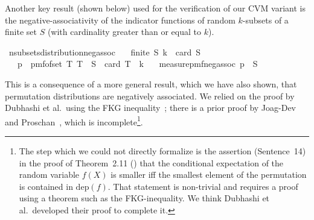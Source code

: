 Another key result (shown below) used for the verification of our CVM variant is the negative-associativity of the indicator functions of random $k$-subsets of a finite set $S$ (with cardinality greater than or equal to $k$).
\begin{isabelle_cm}
\isamarkupfalse%
\ n{\isacharunderscore}{\kern0pt}subsets{\isacharunderscore}{\kern0pt}distribution{\isacharunderscore}{\kern0pt}neg{\isacharunderscore}{\kern0pt}assoc{\isacharcolon}{\kern0pt}\isanewline
\ \ \ {\isacartoucheopen}finite\ S{\isacartoucheclose}\ {\isacartoucheopen}k\ {\isasymle}\ card\ S{\isacartoucheclose}\isanewline
\ \ \ {\isacartoucheopen}p\ {\isasymequiv}\ pmf{\isacharunderscore}{\kern0pt}of{\isacharunderscore}{\kern0pt}set\ {\isacharbraceleft}{\kern0pt}T{\isachardot}{\kern0pt}\ T\ {\isasymsubseteq}\ S\ {\isasymand}\ card\ T\ {\isacharequal}{\kern0pt}\ k{\isacharbraceright}{\kern0pt}{\isacartoucheclose}\isanewline
\ \ \ {\isacartoucheopen}measure{\isacharunderscore}{\kern0pt}pmf{\isachardot}{\kern0pt}neg{\isacharunderscore}{\kern0pt}assoc\ p\ {\isacharparenleft}{\kern0pt}{\isasymin}{\isacharparenright}{\kern0pt}\ S{\isacartoucheclose}
\end{isabelle_cm}
This is a consequence of a more general result, which we have also shown, that permutation distributions are negatively associated.
We relied on the proof by Dubhashi et al.\ using the FKG inequality~\cite[Th. 10]{dubhashi1996}; there is a prior proof by Joag-Dev and Proschan~\cite[Th. 2.11]{joagdev1983}, which is incomplete\footnote{The step which we could not directly formalize is the assertion (Sentence~14) in the proof of Theorem~2.11 (\cite{joagdev1983}) that the conditional expectation of the random variable $f(X)$ is smaller iff the smallest element of the permutation is contained in $\mathrm{dep}(f)$. That statement is non-trivial and requires a proof using a theorem such as the FKG-inequality. We think Dubhashi et al.\ developed their proof to complete it.}.

